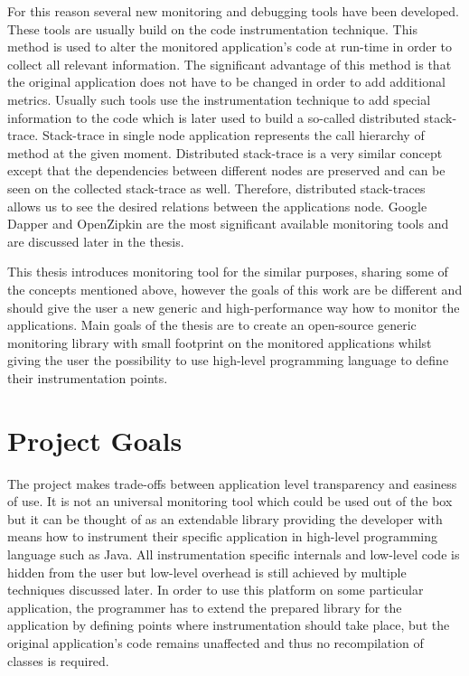 For this reason several new monitoring and debugging tools have been developed. These tools are usually build on the code instrumentation technique. This method is used to alter the monitored application's code at run-time in order to collect all relevant information. The significant advantage of this method is that the original application does not have to be changed in order to add additional metrics. Usually such tools use the instrumentation technique to add special information to the code which is later used to build a so-called distributed stack-trace.  Stack-trace in single node application represents the call hierarchy of method at the given moment. Distributed stack-trace is a very similar concept except that the dependencies between different nodes are preserved and can be seen on the collected stack-trace as well. Therefore, distributed stack-traces allows us to see the desired relations between the applications node. Google Dapper and OpenZipkin are the most significant available monitoring tools and are discussed later in the thesis. 

This thesis introduces monitoring tool for the similar purposes, sharing some of the concepts mentioned above, however the goals of this work are be different and should give the user a new generic and high-performance way how to monitor the applications.  Main goals of the thesis are to create an open-source generic monitoring library with small footprint on the monitored applications whilst giving the user the possibility to use high-level programming language to define their instrumentation points.


\section{Project Goals}
The project makes trade-offs between application level transparency and easiness of use. It is not an universal monitoring tool which could be used out of the box but it can be thought of as an extendable library providing the developer with means how to instrument their specific application in high-level programming language such as Java. All instrumentation specific internals and low-level code is hidden from the user but low-level overhead is still achieved by multiple techniques discussed later. In order to use this platform on some particular application, the programmer has to extend the prepared library for the application by defining points where instrumentation should take place, but the original application's code remains unaffected and thus no recompilation of classes is required.


